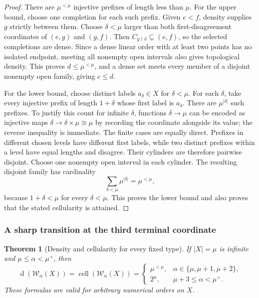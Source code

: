 \documentclass[11pt]{article}
\newtheorem{theorem}{Theorem}[section]
\theoremstyle{definition}
\theoremstyle{remark}
\newcommand{\WO}{\mathcal W}
\newcommand{\dens}{\operatorname{d}}
\newcommand{\cell}{\operatorname{cell}}
\begin{document}
\begin{proof}
There are $\mu^{<\mu}$ injective prefixes of length less than $\mu$.
For the upper bound, choose one completion for each such prefix.  Given
$e<f$, density supplies $g$ strictly between them.  Choose
$\delta<\mu$ larger than both first-disagreement coordinates of
$(e,g)$ and $(g,f)$.  Then
$C_{g\restriction\delta}\subseteq(e,f)$, so the selected completions
are dense.  Since a dense linear order with at least two points has no
isolated endpoint, meeting all nonempty open intervals also gives
topological density.  This proves $d\leq\mu^{<\mu}$, and a dense set
meets every member of a disjoint nonempty open family, giving $c\leq d$.

For the lower bound, choose distinct labels $a_\delta\in X$ for
$\delta<\mu$.  For each $\delta$, take every injective prefix of
length $1+\delta$ whose first label is $a_\delta$.  There are
$\mu^{|\delta|}$ such prefixes.  To justify this count for infinite
$\delta$, functions $\delta\to\mu$ can be encoded as injective maps
$\delta\to\delta\times\mu\cong\mu$ by recording the coordinate
alongside its value; the reverse inequality is immediate.  The finite
cases are equally direct.  Prefixes in different chosen levels have
different first labels, while two distinct prefixes within a level
have equal lengths and disagree.  Their cylinders are therefore
pairwise disjoint.  Choose one nonempty open interval in each cylinder.
The resulting disjoint family has cardinality
\[
 \sum_{\delta<\mu}\mu^{|\delta|}=\mu^{<\mu},
\]
because $1+\delta<\mu$ for every $\delta<\mu$.  This proves the lower
bound and also proves that the stated cellularity is attained.
\end{proof}

\subsubsection{A sharp transition at the third terminal coordinate}

\begin{theorem}[Density and cellularity for every fixed type]
\label{swo:sh:thm:new-all-types-density}
If $|X|=\mu$ is infinite and $\mu\leq\alpha<\mu^+$, then
\[
 \boxed{
 \dens(\WO_\alpha(X))=\cell(\WO_\alpha(X))=
 \begin{cases}
  \mu^{<\mu},&\alpha\in\{\mu,\mu+1,\mu+2\},\\[2pt]
  2^\mu,&\mu+3\leq\alpha<\mu^+.
 \end{cases}}
\]
These formulas are valid for arbitrary numerical orders on $X$.
\end{theorem}
\end{document}
